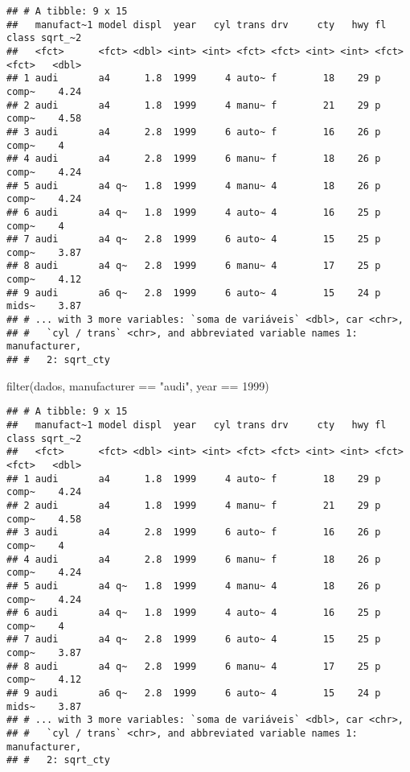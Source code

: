\documentclass[
]{book}
\newenvironment{Shaded}{\begin{snugshade}}{\end{snugshade}}
\newcommand{\DecValTok}[1]{\textcolor[rgb]{0.00,0.00,0.81}{#1}}
\newcommand{\FunctionTok}[1]{\textcolor[rgb]{0.00,0.00,0.00}{#1}}
\newcommand{\NormalTok}[1]{#1}
\newcommand{\SpecialCharTok}[1]{\textcolor[rgb]{0.00,0.00,0.00}{#1}}
\newcommand{\StringTok}[1]{\textcolor[rgb]{0.31,0.60,0.02}{#1}}
\begin{document}
\begin{verbatim}
## # A tibble: 9 x 15
##   manufact~1 model displ  year   cyl trans drv     cty   hwy fl    class sqrt_~2
##   <fct>      <fct> <dbl> <int> <int> <fct> <fct> <int> <int> <fct> <fct>   <dbl>
## 1 audi       a4      1.8  1999     4 auto~ f        18    29 p     comp~    4.24
## 2 audi       a4      1.8  1999     4 manu~ f        21    29 p     comp~    4.58
## 3 audi       a4      2.8  1999     6 auto~ f        16    26 p     comp~    4   
## 4 audi       a4      2.8  1999     6 manu~ f        18    26 p     comp~    4.24
## 5 audi       a4 q~   1.8  1999     4 manu~ 4        18    26 p     comp~    4.24
## 6 audi       a4 q~   1.8  1999     4 auto~ 4        16    25 p     comp~    4   
## 7 audi       a4 q~   2.8  1999     6 auto~ 4        15    25 p     comp~    3.87
## 8 audi       a4 q~   2.8  1999     6 manu~ 4        17    25 p     comp~    4.12
## 9 audi       a6 q~   2.8  1999     6 auto~ 4        15    24 p     mids~    3.87
## # ... with 3 more variables: `soma de variáveis` <dbl>, car <chr>,
## #   `cyl / trans` <chr>, and abbreviated variable names 1: manufacturer,
## #   2: sqrt_cty
\end{verbatim}

\begin{Shaded}
\begin{Highlighting}[]
\FunctionTok{filter}\NormalTok{(dados, manufacturer }\SpecialCharTok{==} \StringTok{"audi"}\NormalTok{, year }\SpecialCharTok{==} \DecValTok{1999}\NormalTok{) }
\end{Highlighting}
\end{Shaded}

\begin{verbatim}
## # A tibble: 9 x 15
##   manufact~1 model displ  year   cyl trans drv     cty   hwy fl    class sqrt_~2
##   <fct>      <fct> <dbl> <int> <int> <fct> <fct> <int> <int> <fct> <fct>   <dbl>
## 1 audi       a4      1.8  1999     4 auto~ f        18    29 p     comp~    4.24
## 2 audi       a4      1.8  1999     4 manu~ f        21    29 p     comp~    4.58
## 3 audi       a4      2.8  1999     6 auto~ f        16    26 p     comp~    4   
## 4 audi       a4      2.8  1999     6 manu~ f        18    26 p     comp~    4.24
## 5 audi       a4 q~   1.8  1999     4 manu~ 4        18    26 p     comp~    4.24
## 6 audi       a4 q~   1.8  1999     4 auto~ 4        16    25 p     comp~    4   
## 7 audi       a4 q~   2.8  1999     6 auto~ 4        15    25 p     comp~    3.87
## 8 audi       a4 q~   2.8  1999     6 manu~ 4        17    25 p     comp~    4.12
## 9 audi       a6 q~   2.8  1999     6 auto~ 4        15    24 p     mids~    3.87
## # ... with 3 more variables: `soma de variáveis` <dbl>, car <chr>,
## #   `cyl / trans` <chr>, and abbreviated variable names 1: manufacturer,
## #   2: sqrt_cty
\end{verbatim}
\end{document}

